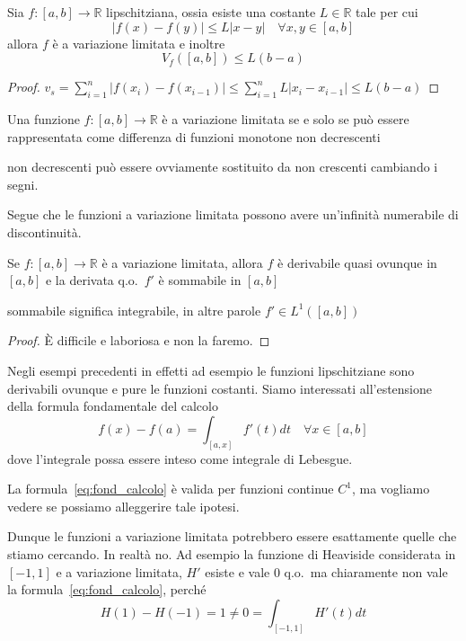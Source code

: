 \begin{proposition}
    Sia \(f : [a,b] \to \mathbb{R}\) lipschitziana, ossia esiste una costante
    \(L \in \mathbb{R}\) tale per cui
    \[
        |f{(x) - f{(y)}}| \le L|x-y| \quad \forall x, y \in [a,b]   
    \]
    allora \(f\) è a variazione limitata e inoltre
    \[
        V_f{([a,b])} \le L(b-a)
    \]
\end{proposition}
\begin{proof}
    \(v_s = \sum_{i=1}^{n} |f{(x_{i})} -f{(x_{i-1} )}| \le \sum_{i=1}^{n} L |
    x_{i} - x_{i-1} | \le L{(b-a)} \) 
\end{proof}
\begin{theorem}[Caratterizzazione]\label{thm:carat_var_lim}
    Una funzione \(f : [a,b] \to \mathbb{R}\) è a variazione limitata se e solo
    se può essere rappresentata come differenza di funzioni monotone non
    decrescenti
\end{theorem}
\begin{remark}
    non decrescenti può essere ovviamente sostituito da non crescenti cambiando
    i segni.
\end{remark}
\begin{remark}
    Segue che le funzioni a variazione limitata possono avere un'infinità
    numerabile di discontinuità.
\end{remark}

\begin{theorem}\label{thm:lebesgue_derivata}
    Se \(f: [a,b] \to \mathbb{R}\) è a variazione limitata, allora \(f\) è
    derivabile quasi ovunque in \([a,b]\) e la derivata q.o.~\(f'\) è sommabile
    in \([a,b]\) 
\end{theorem}
\begin{remark}
    sommabile significa integrabile, in altre parole \(f' \in L^{1}{([a,b])}\) 
\end{remark}
\begin{proof}
    È difficile e laboriosa e non la faremo.
\end{proof}
Negli esempi precedenti in effetti ad esempio le funzioni lipschitziane sono
derivabili ovunque e pure le funzioni costanti.
Siamo interessati all'estensione della formula fondamentale del calcolo
\begin{equation}\label{eq:fond_calcolo}
    f{(x)} - f{(a)} = \int_{[a,x]} f'{(t)} dt \quad \forall x \in [a,b]
\end{equation}
dove l'integrale possa essere inteso come integrale di Lebesgue.
\begin{note}
    La formula~\eqref{eq:fond_calcolo} è valida per funzioni continue \(C^{1}\),
    ma vogliamo vedere se possiamo alleggerire tale ipotesi.
\end{note}
Dunque le funzioni a variazione limitata potrebbero essere esattamente quelle
che stiamo cercando. In realtà no. Ad esempio la funzione di Heaviside
considerata in \([-1, 1]\) e a variazione limitata, \(H'\) esiste e vale 0
q.o.~ma chiaramente non vale la formula~\eqref{eq:fond_calcolo}, perché 
\[
    H{(1)} - H{(-1)} = 1 \neq 0 = \int_{[-1, 1]} H'{(t)} dt 
\]


